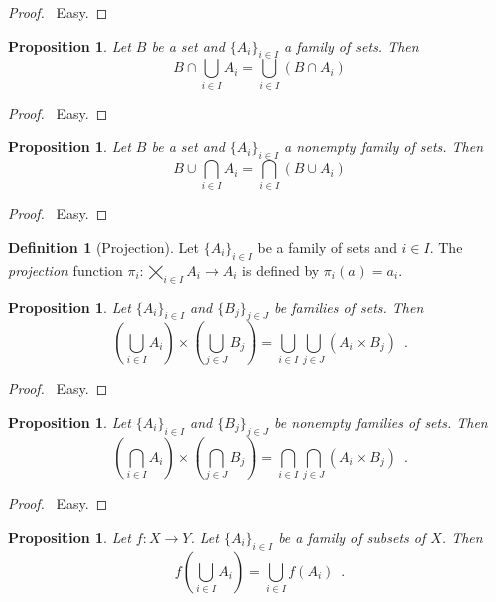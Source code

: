 \documentclass{report}
\let\qed\relax
\newtheorem{prop}[ax]{Proposition}
\theoremstyle{definition}
\newtheorem{df}[ax]{Definition}
\begin{document}
\begin{proof}
\pf\ Easy. \qed
\end{proof}

\begin{prop}
Let $B$ be a set and $\{A_i\}_{i \in I}$ a family of sets. Then
\[ B \cap \bigcup_{i \in I} A_i = \bigcup_{i \in I}
 (B \cap A_i) \]
\end{prop}

\begin{proof}
\pf\ Easy. \qed
\end{proof}

\begin{prop}
Let $B$ be a set and $\{A_i\}_{i \in I}$ a nonempty family of sets. Then
\[ B \cup \bigcap_{i \in I} A_i = \bigcap_{i \in I}
 (B \cup A_i) \]
\end{prop}

\begin{proof}
\pf\ Easy. \qed
\end{proof}

\begin{df}[Projection]
Let $\{A_i\}_{i \in I}$ be a family of sets and $i \in I$. The \emph{projection} function $\pi_i : \bigtimes_{i \in I} A_i \rightarrow A_i$ is defined by $\pi_i(a) = a_i$.
\end{df}

\begin{prop}
Let $\{A_i\}_{i \in I}$ and $\{B_j\}_{j \in J}$ be families of sets. Then
\[ \left( \bigcup_{i \in I} A_i \right) \times \left( \bigcup_{j \in J} B_j \right) = \bigcup_{i \in I} \bigcup_{j \in J} (A_i \times B_j) \enspace . \]
\end{prop}

\begin{proof}
\pf\ Easy. \qed
\end{proof}

\begin{prop}
Let $\{A_i\}_{i \in I}$ and $\{B_j\}_{j \in J}$ be nonempty families of sets. Then
\[ \left( \bigcap_{i \in I} A_i \right) \times \left( \bigcap_{j \in J} B_j \right) = \bigcap_{i \in I} \bigcap_{j \in J} (A_i \times B_j) \enspace . \]
\end{prop}

\begin{proof}
\pf\ Easy. \qed
\end{proof}

\begin{prop}
Let $f : X \rightarrow Y$. Let $\{A_i\}_{i \in I}$ be a family of subsets of $X$. Then
\[ f \left( \bigcup_{i \in I} A_i \right) = \bigcup_{i \in I} f(A_i) \enspace . \]
\end{prop}
\end{document}
